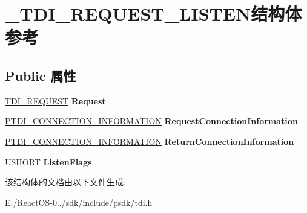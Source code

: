 \hypertarget{struct___t_d_i___r_e_q_u_e_s_t___l_i_s_t_e_n}{}\section{\+\_\+\+T\+D\+I\+\_\+\+R\+E\+Q\+U\+E\+S\+T\+\_\+\+L\+I\+S\+T\+E\+N结构体 参考}
\label{struct___t_d_i___r_e_q_u_e_s_t___l_i_s_t_e_n}
\subsection*{Public 属性}
\begin{DoxyCompactItemize}
\item 
\mbox{\label{struct___t_d_i___r_e_q_u_e_s_t___l_i_s_t_e_n_a6b754051ff84e11b2b12ef98f8df7431}} 
\hyperlink{struct___t_d_i___r_e_q_u_e_s_t}{T\+D\+I\+\_\+\+R\+E\+Q\+U\+E\+ST} {\bfseries Request}
\item 
\mbox{\label{struct___t_d_i___r_e_q_u_e_s_t___l_i_s_t_e_n_a0491e6bb8c683e1707c9096587c0d511}} 
\hyperlink{struct___t_d_i___c_o_n_n_e_c_t_i_o_n___i_n_f_o_r_m_a_t_i_o_n}{P\+T\+D\+I\+\_\+\+C\+O\+N\+N\+E\+C\+T\+I\+O\+N\+\_\+\+I\+N\+F\+O\+R\+M\+A\+T\+I\+ON} {\bfseries Request\+Connection\+Information}
\item 
\mbox{\label{struct___t_d_i___r_e_q_u_e_s_t___l_i_s_t_e_n_ab11c76b1314894887033a34a127663f9}} 
\hyperlink{struct___t_d_i___c_o_n_n_e_c_t_i_o_n___i_n_f_o_r_m_a_t_i_o_n}{P\+T\+D\+I\+\_\+\+C\+O\+N\+N\+E\+C\+T\+I\+O\+N\+\_\+\+I\+N\+F\+O\+R\+M\+A\+T\+I\+ON} {\bfseries Return\+Connection\+Information}
\item 
\mbox{\label{struct___t_d_i___r_e_q_u_e_s_t___l_i_s_t_e_n_abaada3f4e7edc1158648c22deed05b15}} 
U\+S\+H\+O\+RT {\bfseries Listen\+Flags}
\end{DoxyCompactItemize}


该结构体的文档由以下文件生成\+:\begin{DoxyCompactItemize}
\item 
E\+:/\+React\+O\+S-\/0../sdk/include/psdk/tdi.\+h\end{DoxyCompactItemize}
